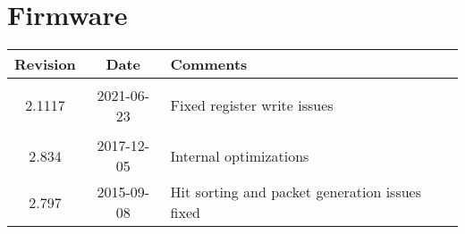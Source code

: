 \section{Firmware}
\begin{tabularx}{\textwidth}{|c|c|X|}
    \hline
    Revision & Date & Comments\\
    \hline\hline
    \hypertarget{fwrev}{2.1117} & 2021-06-23 & Fixed register write issues\\
	\hline
	{2.834} & 2017-12-05 & Internal optimizations\\
    \hline
    {2.797} & 2015-09-08 & Hit sorting and packet generation issues fixed\\
    \hline
\end{tabularx}